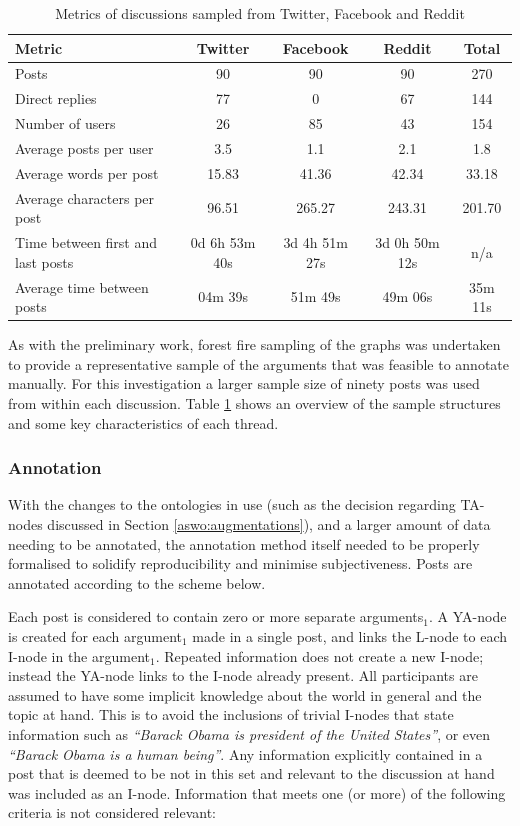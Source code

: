 \begin{table}
\centering
\caption{Metrics of discussions sampled from Twitter, Facebook and Reddit}
\label{table:samples}
\begin{tabular}{| l | c | c | c | c |}
\hline
\textbf{Metric} & \textbf{Twitter} & \textbf{Facebook} & \textbf{Reddit} & \textbf{Total}\\
\hline
Posts & 90 & 90 & 90 & 270\\
\hline
Direct replies & 77 & 0 & 67 & 144\\
\hline
Number of users & 26 & 85 & 43 & 154\\
\hline
Average posts per user & 3.5 & 1.1 & 2.1 & 1.8\\
\hline
Average words per post & 15.83 & 41.36 & 42.34 & 33.18\\
\hline
Average characters per post & 96.51 & 265.27 & 243.31 & 201.70\\
\hline
Time between first and last posts & 0d 6h 53m 40s & 3d 4h 51m 27s & 3d 0h 50m 12s & n/a\\
\hline
Average time between posts & 04m 39s & 51m 49s & 49m 06s & 35m 11s\\
\hline

\end{tabular}
\end{table}

As with the preliminary work, forest fire sampling of the graphs was undertaken to provide a representative sample of the arguments that was feasible to annotate manually. For this investigation a larger sample size of ninety posts was used from within each discussion. Table \ref{table:samples} shows an overview of the sample structures and some key characteristics of each thread.


\subsubsection{Annotation}
\label{aswo:investigation:annotations}
With the changes to the ontologies in use (such as the decision regarding TA-nodes discussed in Section \ref{aswo:augmentations}), and a larger amount of data needing to be annotated, the annotation method itself needed to be properly formalised to solidify reproducibility and minimise subjectiveness. Posts are annotated according to the scheme below.

Each post is considered to contain zero or more separate arguments$_1$. A YA-node is created for each argument$_1$ made in a single post, and links the L-node to each I-node in the argument$_1$. Repeated information does not create a new I-node; instead the YA-node links to the I-node already present. All participants are assumed to have some implicit knowledge about the world in general and the topic at hand. This is to avoid the inclusions of trivial I-nodes that state information such as \textit{``Barack Obama is president of the United States''}, or even \textit{``Barack Obama is a human being''}. Any information explicitly contained in a post that is deemed to be not in this set and relevant to the discussion at hand was included as an I-node. Information that meets one (or more) of the following criteria is not considered relevant:


